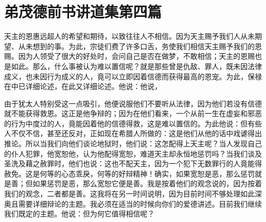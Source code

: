 

\section{弟茂德前书讲道集第四篇}

\par

\par

天主的恩惠远超人的希望和期待，以致往往人不相信。因为天主赐予我们人从未期望、从未想到的事。为此，宗徒们费了许多口舌，务使我们相信天主赐予我们的恩赐。因为人领受了很大的好处时，会问自己是否在做梦，不敢相信；天主的恩赐也是如此。那么，什么事被认为难以置信呢？就是那些曾是仇敌、罪人，既未因法律成义，也未因行为成义的人，竟可以立即因着信德而获得最高的恩宠。为此，保禄在中已详细论述，在此又详细论述。他说：他说，\par

由于犹太人特别受这一点吸引，他便说服他们不要听从法律，因为他们若没有信德就不能获得救恩。这正是他争辩的；因为在他们看来，一个从前一生在虚妄和邪恶的行为中度过的人，竟能因着他的信德得救，这是难以置信的。为此他说：但有些人不仅不信，甚至还反对，正如现在希腊人所做的：这是他们从他的话中戏谑得出推论。所以当我们向他们谈论地狱时，他们说：这怎配得上天主呢？当人发现自己的仆人犯罪，他宽恕他，认为他配得宽恕，难道天主却永恒地惩罚吗？当我们谈及圣洗及藉之赦罪时，他们也说：这也不配天主，因为一个犯下无数罪行的人竟能得赦免。这是何等的心态乖戾，何等的好辩精神！确实，如果宽恕是恶，那么惩罚就是善；但如果惩罚是恶，那么宽恕它便是善。我是按着他们的观念说的，因为按着我们的观念，二者都是善。这我将在另一时间说明，因为目前时间不够处理如此深奥且需要详细辩论的主题。我必须在适当的时候向你们的爱德讲述。目前我们继续我们既定的主题。他说：但为何它值得相信呢？\par

